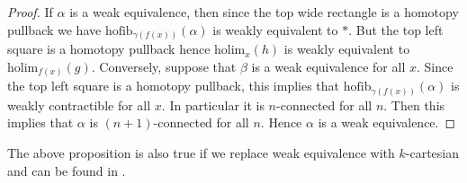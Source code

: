 \documentclass[a4paper]{article}
\begin{document}
\begin{prp}{}{}
\begin{proof}
If $\alpha$ is a weak equivalence, then since the top wide rectangle is a homotopy pullback we have $\text{hofib}_{\gamma(f(x))}(\alpha)$ is weakly equivalent to $\ast$. But the top left square is a homotopy pullback hence $\text{holim}_x(h)$ is weakly equivalent to $\text{holim}_{f(x)}(g)$. Conversely, suppose that $\beta$ is a weak equivalence for all $x$. Since the top left square is a homotopy pullback, this implies that $\text{hofib}_{\gamma(f(x))}(\alpha)$ is weakly contractible for all $x$. In particular it is $n$-connected for all $n$. Then this implies that $\alpha$ is $(n+1)$-connected for all $n$. Hence $\alpha$ is a weak equivalence. 
\end{proof}
\end{prp}

The above proposition is also true if we replace weak equivalence with $k$-cartesian and can be found in \cite{CHT}. 
\end{document}
